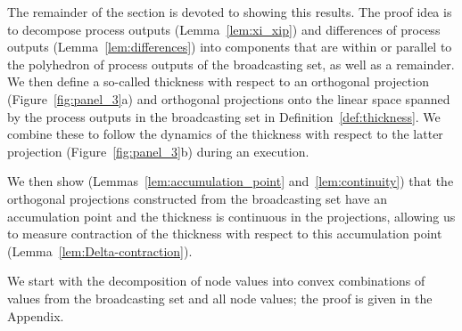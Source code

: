 \documentclass[a4paper,USenglish]{lipics-v2021}
\begin{document}
The remainder of the section is devoted to showing this results.
The proof idea is to decompose process outputs (Lemma~\ref{lem:xi_xip}) and differences of process outputs (Lemma~\ref{lem:differences}) into components that are within or parallel to the polyhedron of process outputs of the broadcasting set, as well as a remainder.
We then define a so-called thickness with respect to an orthogonal projection (Figure~\ref{fig:panel_3}a) and orthogonal projections onto the linear space spanned by the process outputs in the broadcasting set in Definition~\ref{def:thickness}.
We combine these to follow the dynamics of the thickness with respect to the latter projection (Figure~\ref{fig:panel_3}b) during an execution.

We then show (Lemmas~\ref{lem:accumulation_point} and~\ref{lem:continuity}) that the orthogonal projections constructed from the broadcasting set have an accumulation point and the thickness is continuous in the projections, allowing us to measure contraction of the thickness with respect to this accumulation point (Lemma~\ref{lem:Delta-contraction}).

We start with the decomposition of node values into convex combinations of values from the broadcasting set
and all node values; the proof is given in the Appendix.
\end{document}
